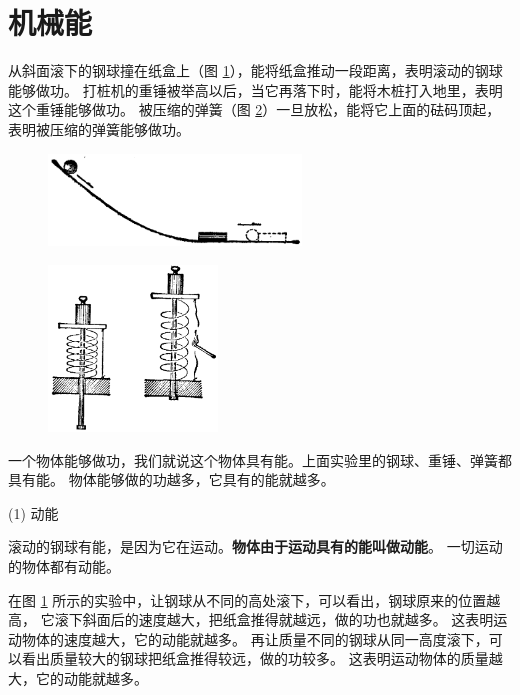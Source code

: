 \section{机械能}\label{sec:8-7}

从斜面滚下的钢球撞在纸盒上（图 \ref{fig:8-10}），能将纸盒推动一段距离，表明滚动的钢球能够做功。
打桩机的重锤被举高以后，当它再落下时，能将木桩打入地里，表明这个重锤能够做功。
被压缩的弹簧（图 \ref{fig:8-11}）一旦放松，能将它上面的砝码顶起，表明被压缩的弹簧能够做功。

\begin{figure}[htbp]
    \centering
    \includegraphics[width=0.6\textwidth]{../pic/czwl1-ch8-10}
    \caption{}\label{fig:8-10}
\end{figure}

\begin{figure}[htbp]
    \centering
    \includegraphics[width=0.4\textwidth]{../pic/czwl1-ch8-11}
    \caption{}\label{fig:8-11}
\end{figure}

一个物体能够做功，我们就说这个物体具有能。上面实验里的钢球、重锤、弹簧都具有能。
物体能够做的功越多，它具有的能就越多。



(1) 动能

滚动的钢球有能，是因为它在运动。\textbf{物体由于运动具有的能叫做动能}。
一切运动的物体都有动能。

在图 \ref{fig:8-10} 所示的实验中，让钢球从不同的高处滚下，可以看出，钢球原来的位置越高，
它滚下斜面后的速度越大，把纸盒推得就越远，做的功也就越多。
这表明运动物体的速度越大，它的动能就越多。
再让质量不同的钢球从同一高度滚下，可以看出质量较大的钢球把纸盒推得较远，做的功较多。
这表明运动物体的质量越大，它的动能就越多。

